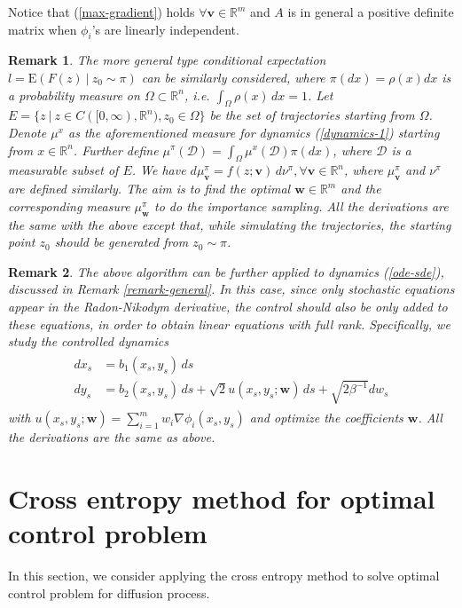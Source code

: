\documentclass[final]{siamltex}
\newtheorem{remark}{Remark}
\begin{document}
Notice that (\ref{max-gradient}) holds $\forall \bm{v} \in \mathbb{R}^m$ and
$A$ is in general a positive definite matrix when $\phi_i$'s are linearly independent.
\begin{remark}
  The more general type conditional expectation 
  $l = \mathrm{E}(F(z)~|~ z_0 \sim \pi)$
  can be similarly considered,
where $\pi(dx) = \rho(x)dx$ is a probability measure on $\Omega
\subset \mathbb{R}^n$, i.e. $\int_\Omega \rho(x)\,dx = 1$. Let $E = \{z ~|~ z \in
  C([0,\infty), \mathbb{R}^n), z_0 \in \Omega\}$ be the set of trajectories
  starting from $\Omega$. Denote $\mu^x$ as the aforementioned measure for
  dynamics (\ref{dynamics-1}) starting from $x \in \mathbb{R}^n$. Further
  define $\mu^\pi(\mathcal{D}) = \int_{\Omega} \mu^x(\mathcal{D}) \pi(dx)$,
  where $\mathcal{D}$ is a measurable subset of $E$.
  We have $d\mu^\pi_{\bm{v}} = f(z;\bm{v})\,d\nu^\pi, \forall
  \bm{v} \in \mathbb{R}^n$, where $\mu^\pi_{\bm{v}}$ and $\nu^{\pi}$ are
  defined similarly. The aim is to find the optimal $\bm{w} \in
  \mathbb{R}^m$ and the corresponding measure $\mu^\pi_{\bm{w}}$ to do
  the importance sampling. All the derivations are the same with the above
  except that, while simulating the trajectories, 
  the starting point $z_0$ should be generated from $z_0 \sim \pi$.
\end{remark}
\begin{remark}
   The above algorithm can be further applied to dynamics (\ref{ode-sde}), discussed
   in Remark \ref{remark-general}. In this case, since only stochastic
   equations appear in the Radon-Nikodym derivative, the control should
   also be only added to these equations, in order to obtain linear equations
   with full rank. Specifically, we study the controlled dynamics 
         \begin{align}
      \begin{split}
	dx_s & = b_1(x_s, y_s)\, ds \\
	dy_s & = b_2(x_s, y_s)\, ds + \sqrt{2} u(x_s, y_s ; \bm{w})\, ds + \sqrt{2\beta^{-1}} dw_s
      \end{split}
      \label{ode-sde-control}
      \end{align}
      with $u(x_s, y_s ; \bm{w}) = \sum\limits_{i=1}^{m} w_i \nabla \phi_i(x_s,
      y_s)$ and optimize the coefficients $\bm{w}$. All the derivations are
      the same as above.
\end{remark}
\section{Cross entropy method for optimal control problem}
\label{sec-ocp}
In this section, we consider applying the cross entropy method to solve optimal control problem
for diffusion process.
\end{document}
